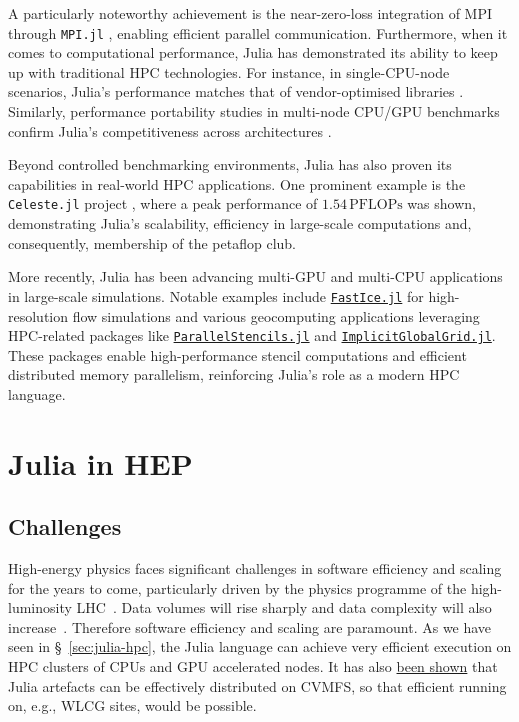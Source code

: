 \documentclass{webofc}
\begin{document}
A particularly noteworthy achievement is the near-zero-loss integration of MPI
through \texttt{MPI.jl} \cite{byrne2021mpi}, enabling efficient parallel
communication. Furthermore, when it comes to computational performance, Julia
has demonstrated its ability to keep up with traditional HPC technologies. For
instance, in single-CPU-node scenarios, Julia's performance matches that of
vendor-optimised libraries \cite{giordano2022productivity}. Similarly,
performance portability studies in multi-node CPU/GPU benchmarks confirm Julia's
competitiveness across architectures
\cite{teichgraber2022julia,godoy2023evaluating}.

Beyond controlled benchmarking environments, Julia has also proven its
capabilities in real-world HPC applications. One prominent example is the
\texttt{Celeste.jl} project \cite{RiegerIEEE:2018,RiegerAAS:2019}, where a peak
performance of \(1.54\,\mathrm{PFLOPs}\) was shown, demonstrating Julia's
scalability, efficiency in large-scale computations and, consequently,
membership of the petaflop club.

More recently, Julia has been advancing multi-GPU and multi-CPU applications in
large-scale simulations. Notable examples include
\href{https://github.com/PTsolvers/FastIce.jl}{\texttt{FastIce.jl}} for
high-resolution flow simulations and various geocomputing applications
leveraging HPC-related packages like
\href{https://github.com/omlins/ParallelStencil.jl}{\texttt{ParallelStencils.jl}}
and
\href{https://github.com/eth-cscs/ImplicitGlobalGrid.jl}{\texttt{ImplicitGlobalGrid.jl}}.
These packages enable high-performance stencil computations and efficient
distributed memory parallelism, reinforcing Julia’s role as a modern HPC
language.

\section{Julia in HEP}

\subsection{Challenges}

High-energy physics faces significant challenges in software efficiency and
scaling for the years to come, particularly driven by the physics programme of
the high-luminosity LHC~\cite{hsfcwp}. Data volumes will rise sharply and data
complexity will also
increase~\cite{CERN-LHCC-2022-005,Software:2815292,Valassi2021}. Therefore
software efficiency and scaling are paramount. As we have seen in
\S~\ref{sec:julia-hpc}, the Julia language can achieve very efficient
execution on HPC clusters of CPUs and GPU accelerated nodes. It has also
\href{https://indico.cern.ch/event/1410341/contributions/6135602/}{been shown}
that Julia artefacts can be effectively distributed on CVMFS, so that efficient
running on, e.g., WLCG sites, would be possible.
\end{document}
